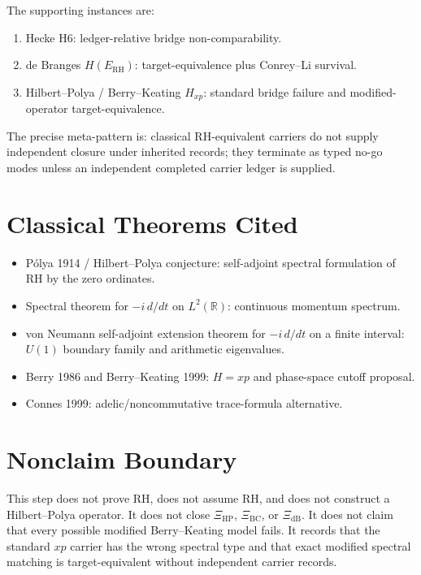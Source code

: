 \documentclass[11pt]{article}
\newcommand{\R}{\mathbb R}
\newcommand{\XiHP}{\Xi_{\mathrm{HP}}}
\newcommand{\XiBC}{\Xi_{\mathrm{BC}}}
\newcommand{\XidB}{\Xi_{\mathrm{dB}}}
\begin{document}
The supporting instances are:
\begin{enumerate}
\item Hecke H6: ledger-relative bridge non-comparability.
\item de Branges \(H(E_{\mathrm{RH}})\): target-equivalence plus
Conrey--Li survival.
\item Hilbert--Polya / Berry--Keating \(H_{xp}\): standard bridge failure and
modified-operator target-equivalence.
\end{enumerate}
The precise meta-pattern is: classical RH-equivalent carriers do not supply
independent closure under inherited records; they terminate as typed no-go
modes unless an independent completed carrier ledger is supplied.

\section*{Classical Theorems Cited}

\begin{itemize}
\item Pólya 1914 / Hilbert--Polya conjecture: self-adjoint spectral
formulation of RH by the zero ordinates.
\item Spectral theorem for \(-i\,d/dt\) on \(L^2(\R)\): continuous momentum
spectrum.
\item von Neumann self-adjoint extension theorem for \(-i\,d/dt\) on a finite
interval: \(U(1)\) boundary family and arithmetic eigenvalues.
\item Berry 1986 and Berry--Keating 1999: \(H=xp\) and phase-space cutoff
proposal.
\item Connes 1999: adelic/noncommutative trace-formula alternative.
\end{itemize}

\section*{Nonclaim Boundary}

This step does not prove RH, does not assume RH, and does not construct a
Hilbert--Polya operator.  It does not close \(\XiHP\), \(\XiBC\), or
\(\XidB\).  It does not claim that every possible modified Berry--Keating
model fails.  It records that the standard \(xp\) carrier has the wrong
spectral type and that exact modified spectral matching is target-equivalent
without independent carrier records.
\end{document}
